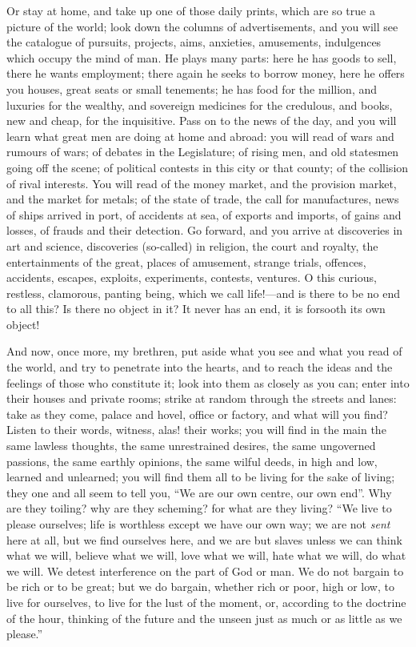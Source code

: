 Or stay at home, and take up one of those daily prints, which are
so true a picture of the world; look down the columns of
advertisements, and you will see the catalogue of pursuits, projects,
aims, anxieties, amusements, indulgences which occupy the mind of man.
He plays many parts: here he has goods to sell, there he wants
employment; there again he seeks to borrow money, here he offers you
houses, great seats or small tenements; he has food for the million,
and luxuries for the wealthy, and sovereign medicines for the
credulous, and books, new and cheap, for the inquisitive. Pass on to
the news of the day, and you will learn what great men are doing at
home and abroad: you will read of wars and rumours of wars; of debates
in the Legislature; of rising men, and old statesmen going off the
scene; of political contests in this city or that county; of the
collision of rival interests. You will read of the money market, and
the provision market, and the market for metals; of the state of
trade, the call for manufactures, news of ships arrived in port, of
accidents at sea, of exports and imports, of gains and losses, of
frauds and their detection. Go forward, and you arrive at discoveries
in art and science, discoveries (so-called) in religion, the court and
royalty, the entertainments of the great, places of amusement, strange
trials, offences, accidents, escapes, exploits, experiments, contests,
ventures. O this curious, restless, clamorous, panting being, which we
call life!—and is there to be no end to all this? Is there no object
in it? It never has an end, it is forsooth its own object!

And now, once more, my brethren, put aside what you see and what
you read of the world, and try to penetrate into the hearts, and to
reach the ideas and the feelings of those who constitute it; look into
them as closely as you can; enter into their houses and private rooms;
strike at random through the streets and lanes: take as they come,
palace and hovel, office or factory, and what will you find? Listen to
their words, witness, alas! their works; you will find in the main the
same lawless thoughts, the same unrestrained desires, the same
ungoverned passions, the same earthly opinions, the same wilful deeds,
in high and low, learned and unlearned; you will find them all to be
living for the sake of living; they one and all seem to tell you,
``We are our own centre, our own end''. Why are they toiling?
why are they scheming? for what are they living? ``We live to
please ourselves; life is worthless except we have our own way; we are
not \emph{sent} here at all, but we find ourselves here, and we are but
slaves unless we can think what we will, believe what we will, love
what we will, hate what we will, do what we will. We detest
interference on the part of God or man. We do not bargain to be rich
or to be great; but we do bargain, whether rich or poor, high or low,
to live for ourselves, to live for the lust of the moment, or,
according to the doctrine of the hour, thinking of the future and the
unseen just as much or as little as we please.''

